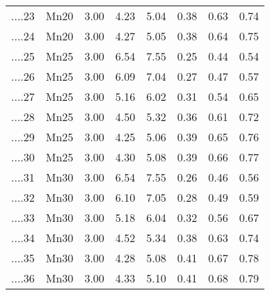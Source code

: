 \begin{table}[ht]
\begin{tabular}{rlrrrrrr}
  ....23 & Mn20 & 3.00 & 4.23 & 5.04 & 0.38 & 0.63 & 0.74 \\ 
  ....24 & Mn20 & 3.00 & 4.27 & 5.05 & 0.38 & 0.64 & 0.75 \\ 
  ....25 & Mn25 & 3.00 & 6.54 & 7.55 & 0.25 & 0.44 & 0.54 \\ 
  ....26 & Mn25 & 3.00 & 6.09 & 7.04 & 0.27 & 0.47 & 0.57 \\ 
  ....27 & Mn25 & 3.00 & 5.16 & 6.02 & 0.31 & 0.54 & 0.65 \\ 
  ....28 & Mn25 & 3.00 & 4.50 & 5.32 & 0.36 & 0.61 & 0.72 \\ 
  ....29 & Mn25 & 3.00 & 4.25 & 5.06 & 0.39 & 0.65 & 0.76 \\ 
  ....30 & Mn25 & 3.00 & 4.30 & 5.08 & 0.39 & 0.66 & 0.77 \\ 
  ....31 & Mn30 & 3.00 & 6.54 & 7.55 & 0.26 & 0.46 & 0.56 \\ 
  ....32 & Mn30 & 3.00 & 6.10 & 7.05 & 0.28 & 0.49 & 0.59 \\ 
  ....33 & Mn30 & 3.00 & 5.18 & 6.04 & 0.32 & 0.56 & 0.67 \\ 
  ....34 & Mn30 & 3.00 & 4.52 & 5.34 & 0.38 & 0.63 & 0.74 \\ 
  ....35 & Mn30 & 3.00 & 4.28 & 5.08 & 0.41 & 0.67 & 0.78 \\ 
  ....36 & Mn30 & 3.00 & 4.33 & 5.10 & 0.41 & 0.68 & 0.79 \\ 
   \hline
\end{tabular}
\end{table}

